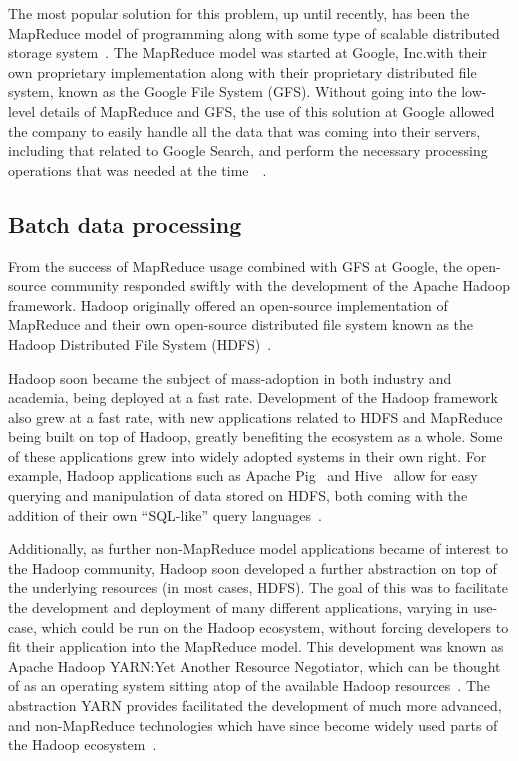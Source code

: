 \documentclass[a4paper,11pt]{article}
\begin{document}
The most popular solution for this problem, up until recently, has been the MapReduce model of programming along with
some type of scalable distributed storage system~\cite{bifet_mining_2013}. The MapReduce model was started at Google,
Inc.\@ with their own proprietary implementation along with their proprietary distributed file system, known as the Google
File System (GFS). Without going into the low-level details of MapReduce and GFS, the use of this solution at Google
allowed the company to easily handle all the data that was coming into their servers, including that related to Google Search, and perform the necessary
processing operations that was needed at the time~\cite{ghemawat_google_2003}~\cite{dean_mapreduce:_2008}.


\subsection{Batch data processing} %
\label{sub:apache hadoop}

From the success of MapReduce usage combined with GFS at Google, the open-source community responded swiftly with the
development of the Apache Hadoop framework. Hadoop originally offered an open-source implementation of MapReduce and
their own open-source distributed file system known as the Hadoop Distributed File System
(HDFS)~\cite{shvachko_hadoop_2010}.

Hadoop soon became the subject of mass-adoption in both industry and academia, being deployed at a fast rate.
Development of the Hadoop framework also grew at a fast rate, with new applications related to HDFS and MapReduce being
built on top of Hadoop, greatly benefiting the ecosystem as a whole. Some of these applications grew into widely adopted
systems in their own right. For example, Hadoop applications such as Apache Pig~\cite{gates_building_2009} and
Hive~\cite{thusoo_hive_2010} allow for easy querying and manipulation of data stored on HDFS, both coming with the
addition of their own ``SQL-like'' query languages~\cite{olston_pig_2008}.

Additionally, as further non-MapReduce model applications became of interest to the Hadoop community, Hadoop soon
developed a further abstraction on top of the underlying resources (in most cases, HDFS). The goal of this was to
facilitate the development and deployment of many different applications, varying in use-case, which could be run on the
Hadoop ecosystem, without forcing developers to fit their application into the MapReduce model. This development was
known as Apache Hadoop YARN:\@ Yet Another Resource Negotiator, which can be thought of as an operating system sitting
atop of the available Hadoop resources~\cite{vavilapalli_apache_2013}. The abstraction YARN provides facilitated the
development of much more advanced, and non-MapReduce technologies which have since become widely used parts of the
Hadoop ecosystem~\cite{harrison_hadoops_2012}.
\end{document}
